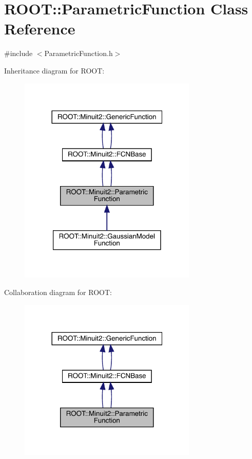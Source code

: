 \hypertarget{classROOT_1_1Minuit2_1_1ParametricFunction}{}\section{R\+O\+OT\+:\+:Parametric\+Function Class Reference}
\label{classROOT_1_1Minuit2_1_1ParametricFunction}


{\ttfamily \#include $<$Parametric\+Function.\+h$>$}



Inheritance diagram for R\+O\+OT\+:\nopagebreak
\begin{figure}[H]
\begin{center}
\leavevmode
\includegraphics[width=240pt]{dc/d10/classROOT_1_1Minuit2_1_1ParametricFunction__inherit__graph}
\end{center}
\end{figure}


Collaboration diagram for R\+O\+OT\+:\nopagebreak
\begin{figure}[H]
\begin{center}
\leavevmode
\includegraphics[width=240pt]{d8/dc4/classROOT_1_1Minuit2_1_1ParametricFunction__coll__graph}
\end{center}
\end{figure}

